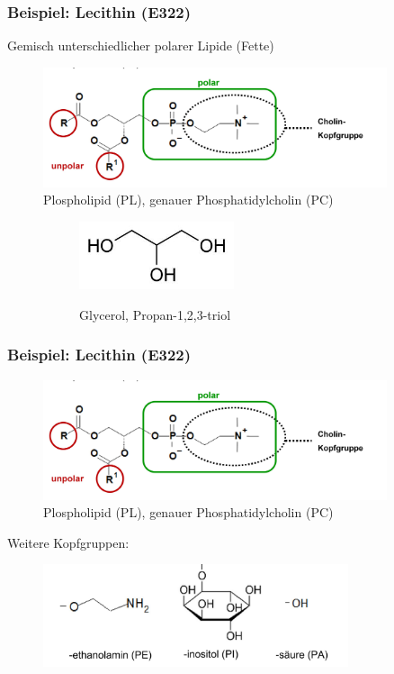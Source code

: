 \documentclass{beamer} %
\begin{document}
\begin{frame}
\frametitle{Beispiel: Lecithin (E322)}
\begin{block}{}
Gemisch unterschiedlicher polarer Lipide (Fette)
\end{block}
\begin{figure}
\centering
\includegraphics[width = 0.9\textwidth]{Lecithin.JPG}
\caption{Plospholipid (PL), genauer Phosphatidylcholin (PC) }
\end{figure}

\pause
\begin{figure}[H]
\centering
\begin{subfigure}[c]{0.5\textwidth}
\centering
\includegraphics[width = 0.5\textwidth]{glycerol.jpg}
\end{subfigure}
\begin{subfigure}[c]{0.45\textwidth}
\centering
Glycerol, Propan-1,2,3-triol
\end{subfigure}
\end{figure}
\end{frame}

\begin{frame}
\frametitle{Beispiel: Lecithin (E322)}
\begin{figure}
\centering
\includegraphics[width = 0.9\textwidth]{Lecithin.JPG}
\caption{Plospholipid (PL), genauer Phosphatidylcholin (PC) }
\end{figure}
Weitere Kopfgruppen:
\begin{figure}[h]
\centering
\includegraphics[width = 0.8\textwidth]{Kopfgruppen.JPG}
\end{figure}
\end{frame}
\end{document}
